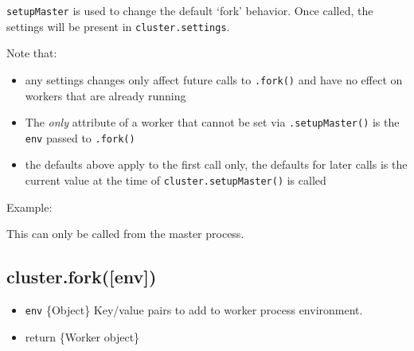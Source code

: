\texttt{setupMaster} is used to change the default `fork' behavior. Once
called, the settings will be present in \texttt{cluster.settings}.

Note that:

\begin{itemize}
\itemsep1pt\parskip0pt
\item
  any settings changes only affect future calls to \texttt{.fork()} and
  have no effect on workers that are already running
\item
  The \emph{only} attribute of a worker that cannot be set via
  \texttt{.setupMaster()} is the \texttt{env} passed to \texttt{.fork()}
\item
  the defaults above apply to the first call only, the defaults for
  later calls is the current value at the time of
  \texttt{cluster.setupMaster()} is called
\end{itemize}

Example:

\begin{Shaded}
\begin{Highlighting}[]
 \NormalTok{(}\NormalTok{);}
\NormalTok{(\{}
  \NormalTok{: }\NormalTok{,}
  \NormalTok{: [}\NormalTok{, }\NormalTok{],}
  \NormalTok{: }
\NormalTok{\});}
\NormalTok{(); }
\NormalTok{(\{}
  \NormalTok{: [}\NormalTok{, }\NormalTok{]}
\NormalTok{\});}
\NormalTok{(); }
\end{Highlighting}
\end{Shaded}

This can only be called from the master process.

\subsection{cluster.fork({[}env{]})}\label{cluster.forkenv}

\begin{itemize}
\itemsep1pt\parskip0pt
\item
  \texttt{env} \{Object\} Key/value pairs to add to worker process
  environment.
\item
  return \{Worker object\}
\end{itemize}

